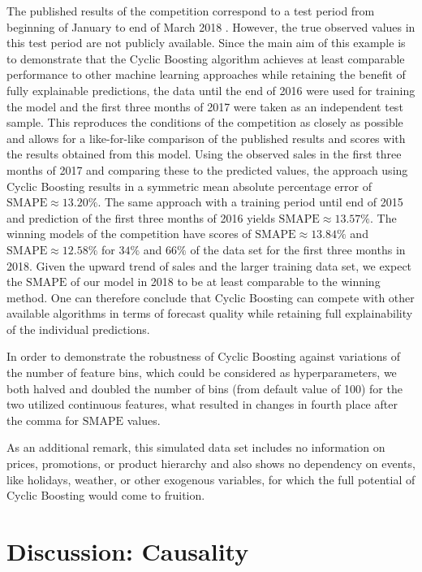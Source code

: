 \documentclass[BCOR=1mm, DIV=calc,10pt,
twoside=true,
twocolumn,
headings=normal]{scrartcl}
\begin{document}
The published results of the competition correspond to a test period from beginning of
January to end of March 2018 \cite{kaggle_data}. However, the true observed values in this
test period are not publicly available. Since the main aim of this example is to
demonstrate that the Cyclic Boosting algorithm achieves at least comparable performance to
other machine learning approaches while retaining the benefit of fully explainable
predictions, the data until the end of 2016 were used for training the model and the first
three months of 2017 were taken as an independent test sample. This reproduces the
conditions of the competition as closely as possible and allows for a like-for-like
comparison of the published results and scores with the results obtained from this model.
Using the observed sales in the first three months of 2017 and comparing these to the
predicted values, the approach using Cyclic Boosting results in a symmetric mean absolute
percentage error of $\mathrm{SMAPE} \approx 13.20\%$. The same approach with a training
period until end of 2015 and prediction of the first three months of 2016 yields
$\mathrm{SMAPE} \approx 13.57\%$. The winning models of the competition have scores of
$\mathrm{SMAPE} \approx 13.84\%$ and $\mathrm{SMAPE} \approx 12.58\%$ for $34\%$ and
$66\%$ of the data set for the first three months in 2018. Given the upward trend of sales
and the larger training data set, we expect the $\mathrm{SMAPE}$ of our model in 2018 to
be at least comparable to the winning method. One can therefore conclude that Cyclic
Boosting can compete with other available algorithms in terms of forecast quality while
retaining full explainability of the individual predictions.

In order to demonstrate the robustness of Cyclic Boosting against variations of the number
of feature bins, which could be considered as hyperparameters, we both halved and doubled
the number of bins (from default value of 100) for the two utilized continuous features,
what resulted in changes in fourth place after the comma for $\mathrm{SMAPE}$ values.

As an additional remark, this simulated data set includes no information on prices,
promotions, or product hierarchy and also shows no dependency on events, like holidays,
weather, or other exogenous variables, for which the full potential of Cyclic Boosting
would come to fruition.


\section{Discussion: Causality}
\label{causality}
\end{document}
